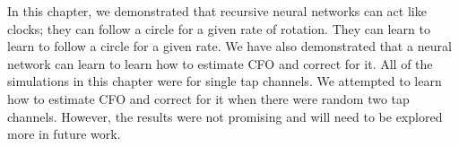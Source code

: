 In this chapter, we demonstrated that recursive neural networks can act like clocks; they can follow a circle for a given rate of rotation.  They can learn to learn to follow a circle for a given rate.
We have also demonstrated that a neural network can learn to learn how to estimate CFO and correct for it.  All of the simulations in this chapter were for single tap channels.  We attempted to learn how to estimate CFO and correct for it when there were random two tap channels.  However, the results were not promising and will need to be explored more in future work.

